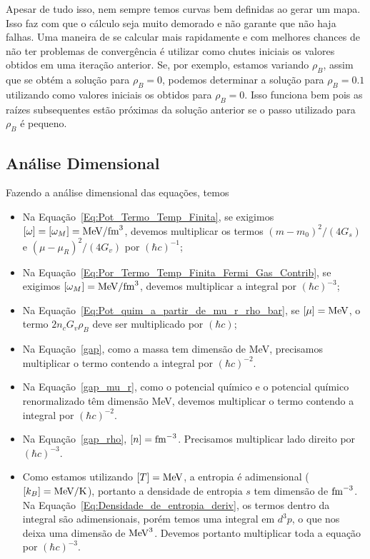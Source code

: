 Apesar de tudo isso, nem sempre temos curvas bem definidas ao gerar um mapa. Isso faz com que o cálculo seja muito demorado e não garante que não haja falhas. Uma maneira de se calcular mais rapidamente e com melhores chances de não ter problemas de convergência é utilizar como chutes iniciais os valores obtidos em uma iteração anterior. Se, por exemplo, estamos variando $\rho_B$, assim que se obtém a solução para $\rho_B = 0$, podemos determinar a solução para $\rho_B = 0.1$ utilizando como valores iniciais os obtidos para $\rho_B = 0$. Isso funciona bem pois as raízes subsequentes estão próximas da solução anterior se o passo utilizado para $\rho_B$ é pequeno.

\subsection{Análise Dimensional}

Fazendo a análise dimensional das equações, temos
\begin{itemize}
	\item Na Equação~\eqref{Eq:Pot_Termo_Temp_Finita}, se exigimos $[\omega] = [\omega_M] = \rm{MeV}/\rm{fm}^3$, devemos multiplicar os termos $(m - m_0)^2/(4G_s)$ e $(\mu - \mu_R)^2/(4G_v)$ por $(\hbar c)^{-1}$;
	\item Na Equação~\eqref{Eq:Por_Termo_Temp_Finita_Fermi_Gas_Contrib}, se exigimos $[\omega_M] = \rm{MeV}/\rm{fm}^3$, devemos multiplicar a integral por $(\hbar c)^{-3}$;
	\item Na Equação~\eqref{Eq:Pot_quim_a_partir_de_mu_r_rho_bar}, se $[\mu] = \rm{MeV}$, o termo $2 n_c G_v \rho_B$ deve ser multiplicado por $(\hbar c)$;
	\item Na Equação~\eqref{gap}, como a massa tem dimensão de MeV, precisamos multiplicar o termo contendo a integral por $(\hbar c)^{-2}$.
	\item Na Equação~\eqref{gap_mu_r}, como o potencial químico e o potencial químico renormalizado têm dimensão MeV, devemos multiplicar o termo contendo a integral por $(\hbar c)^{-2}$.
	\item Na Equação~\eqref{gap_rho}, $[n] = \rm{fm}^{-3}$. Precisamos multiplicar lado direito por $(\hbar c)^{-3}$.
	\item Como estamos utilizando $[T] = \rm{MeV}$, a entropia é adimensional ($[k_B] = \textrm{MeV}/\rm{K}$), portanto a densidade de entropia $s$ tem dimensão de $\rm{fm}^{-3}$. Na Equação~\eqref{Eq:Densidade_de_entropia_deriv}, os termos dentro da integral são adimensionais, porém temos uma integral em $d^3p$, o que nos deixa uma dimensão de $\rm{MeV}^3$. Devemos portanto multiplicar toda a equação por $(\hbar c)^{-3}$.
\end{itemize}

